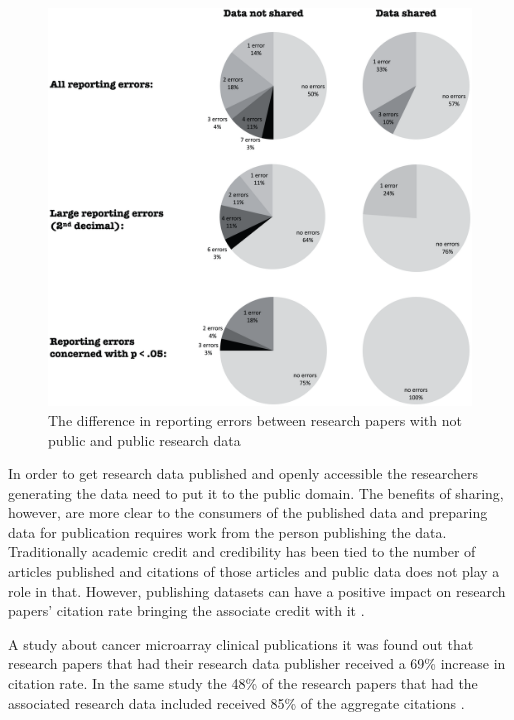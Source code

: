 \begin{figure}
    \begin{centering}
        \includegraphics[width=\textwidth]{images/reporting_errors}
    \end{centering}
    \caption{The difference in reporting errors between research papers with not public and public research data \cite{wicherts2011willingness}}
    \label{fig:errors}
\end{figure}

In order to get research data published and openly accessible the researchers
generating the data need to put it to the public domain. The benefits of
sharing, however, are more clear to the consumers of the published data and
preparing data for publication requires work from the person publishing the
data. Traditionally academic credit and credibility has been tied to the number
of articles published and citations of those articles and public data does not
play a role in that. However, publishing datasets can have a positive impact on
research papers' citation rate bringing the associate credit with it
\cite{piwowar2007sharing}.

A study about cancer microarray clinical publications it was found out that
research papers that had their research data publisher received a 69\%
increase in citation rate. In the same study the 48\% of the research papers
that had the associated research data included received 85\% of the aggregate
citations \cite{piwowar2007sharing}.

